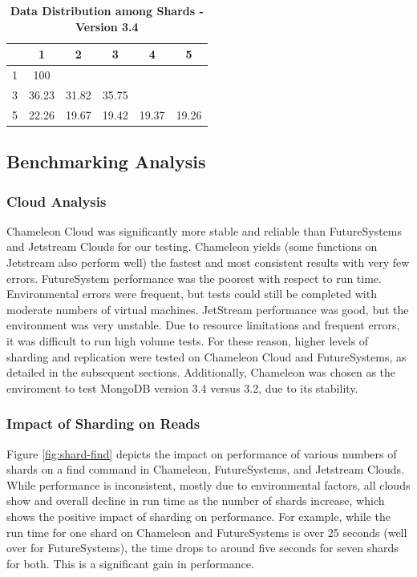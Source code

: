 \documentclass[9pt,twocolumn,twoside]{../../styles/osajnl}
\begin{document}
\begin{table}[htbp]
\centering
\caption{\bf Data Distribution among Shards - Version 3.4}

 \begin{tabular}{| c | c | c | c | c | c |} 
 \hline
  &  1    &  2    &  3    &   4   & 5 \\ [0.5ex]
\hline
  \hline
1 & 100   &       &       &       &   \\
\hline
3 & 36.23 & 31.82 & 35.75 &       &   \\
\hline
5 & 22.26 & 19.67 & 19.42 & 19.37 & 19.26   \\
\hline
\end{tabular}
  \label{tab:data-dist34}
\end{table}






\subsection{Benchmarking Analysis}


\subsubsection{Cloud Analysis}

Chameleon Cloud was significantly more stable and reliable than FutureSystems and Jetstream Clouds for our testing.  Chameleon yields (some functions on Jetstream also perform well) the fastest and most consistent results with very few errors.  FutureSystem performance was the poorest with respect to run time.  Environmental errors were frequent, but tests could still be completed with moderate numbers of virtual machines.  JetStream performance was good, but the environment was very unstable.  Due to resource limitations and frequent errors, it was difficult to run high volume tests.  For these reason, higher levels of sharding and replication were tested on Chameleon Cloud and FutureSystems, as detailed in the subsequent sections.  Additionally, Chameleon was chosen as the enviroment to test MongoDB version 3.4 versus 3.2, due to its stability.

\subsubsection{Impact of Sharding on Reads}




Figure \ref{fig:shard-find} depicts the impact on performance of various numbers of shards on a find command in Chameleon, FutureSystems, and Jetstream Clouds.  While performance is inconsistent, mostly due to environmental factors, all clouds show and overall decline in run time as the number of shards increase, which shows the positive impact of sharding on performance.  For example, while the run time for one shard on Chameleon and FutureSystems is over 25 seconds (well over for FutureSystems), the time drops to around five seconds for seven shards for both.  This is a significant gain in performance. 
\end{document}
